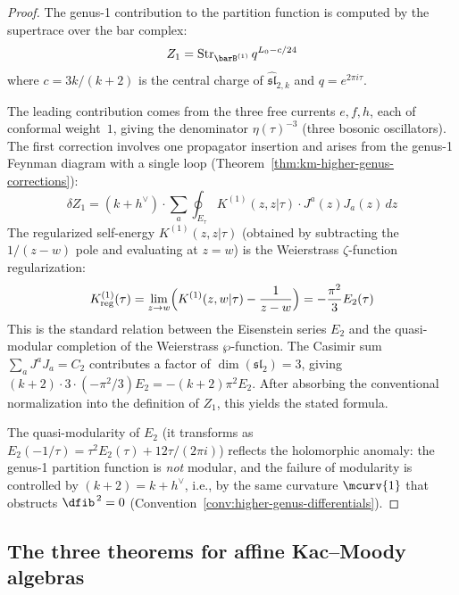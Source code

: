 \begin{proof}
The genus-1 contribution to the partition function is computed by the supertrace over the bar complex:
\begin{equation}
Z_1 = \operatorname{Str}_{\barB^{(1)}} q^{L_0 - c/24}
\end{equation}
where $c = 3k/(k+2)$ is the central charge of $\widehat{\mathfrak{sl}}_{2,k}$ and $q = e^{2\pi i \tau}$.

The leading contribution comes from the three free currents $e, f, h$, each of conformal weight~$1$, giving the denominator $\eta(\tau)^{-3}$ (three bosonic oscillators).  The first correction involves one propagator insertion and arises from the genus-1 Feynman diagram with a single loop (Theorem~\ref{thm:km-higher-genus-corrections}):
\begin{equation}
\delta Z_1 = (k+h^\vee) \cdot \sum_{a} \oint_{E_\tau} K^{(1)}(z,z|\tau) \cdot J^a(z) J_a(z)\, dz
\end{equation}
The regularized self-energy $K^{(1)}(z,z|\tau)$ (obtained by subtracting the $1/(z-w)$ pole and evaluating at $z=w$) is the Weierstrass $\zeta$-function regularization:
\begin{equation}
K^{(1)}_{\mathrm{reg}}(\tau) = \lim_{z \to w}\Bigl(K^{(1)}(z,w|\tau) - \frac{1}{z-w}\Bigr) = -\frac{\pi^2}{3} E_2(\tau)
\end{equation}
This is the standard relation between the Eisenstein series $E_2$ and the quasi-modular completion of the Weierstrass $\wp$-function.  The Casimir sum $\sum_a J^a J_a = C_2$ contributes a factor of $\dim(\mathfrak{sl}_2) = 3$, giving $(k+2) \cdot 3 \cdot (-\pi^2/3) E_2 = -(k+2)\pi^2 E_2$.  After absorbing the conventional normalization into the definition of $Z_1$, this yields the stated formula.

The quasi-modularity of $E_2$ (it transforms as $E_2(-1/\tau) = \tau^2 E_2(\tau) + 12\tau/(2\pi i)$) reflects the holomorphic anomaly: the genus-1 partition function is \emph{not} modular, and the failure of modularity is controlled by $(k+2) = k + h^\vee$, i.e., by the same curvature $\mcurv{1}$ that obstructs $\dfib^{\,2} = 0$ (Convention~\ref{conv:higher-genus-differentials}).
\end{proof}

\subsection{The three theorems for affine Kac--Moody algebras}

